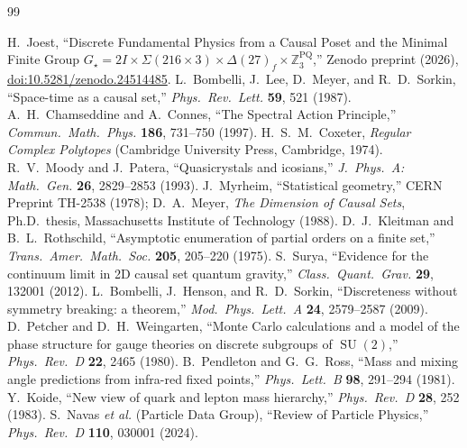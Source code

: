 \documentclass[11pt,a4paper]{article}
\theoremstyle{definition}
\theoremstyle{remark}
\newcommand{\Z}{\mathbb{Z}}
\newcommand{\SU}{\operatorname{SU}}
\begin{document}
\begin{thebibliography}{99}\raggedright
{} H.~Joest, ``Discrete Fundamental Physics from a Causal Poset and the Minimal Finite Group $G_\star = 2I \times \Sigma(216 \times 3) \times \Delta(27)_f \times \Z_3^{\mathrm{PQ}}$,'' Zenodo preprint (2026), \href{https://doi.org/10.5281/zenodo.24514485}{doi:10.5281/zenodo.24514485}.
 L.~Bombelli, J.~Lee, D.~Meyer, and R.~D.~Sorkin, ``Space-time as a causal set,'' \emph{Phys.\ Rev.\ Lett.} \textbf{59}, 521 (1987).
 A.~H.~Chamseddine and A.~Connes, ``The Spectral Action Principle,'' \emph{Commun.\ Math.\ Phys.} \textbf{186}, 731--750 (1997).
 H.~S.~M.~Coxeter, \emph{Regular Complex Polytopes} (Cambridge University Press, Cambridge, 1974).
 R.~V.~Moody and J.~Patera, ``Quasicrystals and icosians,'' \emph{J.\ Phys.\ A: Math.\ Gen.} \textbf{26}, 2829--2853 (1993).
 J.~Myrheim, ``Statistical geometry,'' CERN Preprint TH-2538 (1978); D.~A.~Meyer, \emph{The Dimension of Causal Sets}, Ph.D.\ thesis, Massachusetts Institute of Technology (1988).
 D.~J.~Kleitman and B.~L.~Rothschild, ``Asymptotic enumeration of partial orders on a finite set,'' \emph{Trans.\ Amer.\ Math.\ Soc.} \textbf{205}, 205--220 (1975).
 S.~Surya, ``Evidence for the continuum limit in 2D causal set quantum gravity,'' \emph{Class.\ Quant.\ Grav.} \textbf{29}, 132001 (2012).
 L.~Bombelli, J.~Henson, and R.~D.~Sorkin, ``Discreteness without symmetry breaking: a theorem,'' \emph{Mod.\ Phys.\ Lett.\ A} \textbf{24}, 2579--2587 (2009).
 D.~Petcher and D.~H.~Weingarten, ``Monte Carlo calculations and a model of the phase structure for gauge theories on discrete subgroups of $\SU(2)$,'' \emph{Phys.\ Rev.\ D} \textbf{22}, 2465 (1980).
 B.~Pendleton and G.~G.~Ross, ``Mass and mixing angle predictions from infra-red fixed points,'' \emph{Phys.\ Lett.\ B} \textbf{98}, 291--294 (1981).
 Y.~Koide, ``New view of quark and lepton mass hierarchy,'' \emph{Phys.\ Rev.\ D} \textbf{28}, 252 (1983).
 S.~Navas \emph{et al.} (Particle Data Group), ``Review of Particle Physics,'' \emph{Phys.\ Rev.\ D} \textbf{110}, 030001 (2024).
\end{thebibliography}
\end{document}
